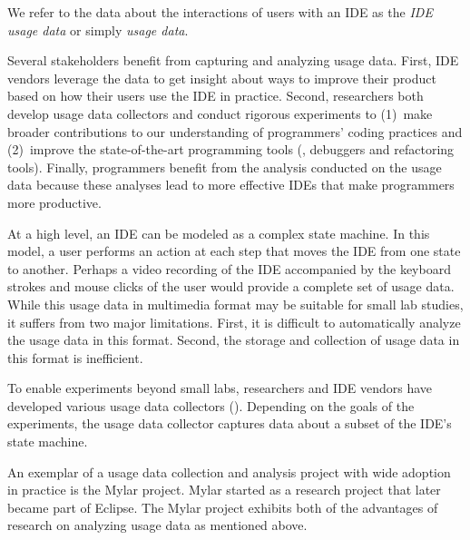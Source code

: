 
We refer to the data about the interactions of users with an IDE as the
\emph{IDE usage data} or simply \emph{usage data}.

%
Several stakeholders benefit from capturing and analyzing usage data. First, IDE
vendors leverage the data to get insight about ways to improve their product
based on how their users use the IDE in practice. Second, researchers both
develop usage data collectors and conduct rigorous experiments to (1)~make
broader contributions to our understanding of programmers' coding practices and
(2)~improve the state-of-the-art programming tools (\eg, debuggers and
refactoring tools). Finally, programmers benefit from the analysis conducted on
the usage data because these analyses lead to more effective IDEs that make
programmers more productive.

At a high level, an IDE can be modeled as a complex state machine. In this
model, a user performs an action at each step that moves the IDE from one state
to another.
%
Perhaps a video recording of the IDE accompanied by the keyboard strokes and
mouse clicks of the user would provide a complete set of usage data.
%
While this usage data in multimedia format may be suitable for small lab
studies, it suffers from two major limitations. First, it is difficult to
automatically analyze the usage data in this format. Second, the storage and
collection of usage data in this format is inefficient.

To enable experiments beyond small labs, researchers and IDE vendors have
developed various usage data collectors ().
Depending on the goals of the experiments, the usage data collector captures
data about a subset of the IDE's state machine.

An exemplar of a usage data collection and analysis project with wide adoption
in practice is the Mylar project. Mylar started as a research project that later
became part of Eclipse. The Mylar project exhibits both of the advantages of
research on analyzing usage data as mentioned above.

